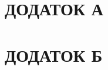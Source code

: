 \documentclass[a4paper,14pt]{extreport}
\begin{document}
\newpage
\chapter{ДОДАТОК А }
	\begin{figure}[h!]
	\label{ris2-d}
	\end{figure}

\newpage
\chapter{ДОДАТОК Б}
	\begin{landscape}
	\begin{figure}[h!]

	\label{ris2-d}
	\end{figure}

	\begin{figure}[h!]


\end{figure}
\end{landscape}
\end{document}
